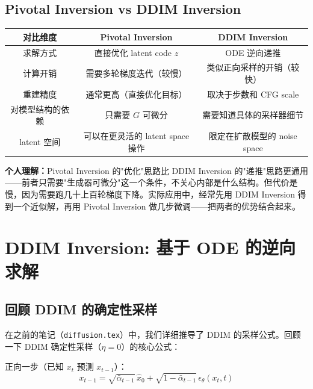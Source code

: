 \documentclass[11pt,a4paper]{article}
\theoremstyle{definition}
\begin{document}
\subsection{Pivotal Inversion vs DDIM Inversion}

\begin{center}
\begin{tabular}{c|c|c}
    \toprule
    \textbf{对比维度} & \textbf{Pivotal Inversion} & \textbf{DDIM Inversion} \\
    \midrule
    求解方式 & 直接优化 latent code $z$ & ODE 逆向递推 \\
    计算开销 & 需要多轮梯度迭代（较慢） & 类似正向采样的开销（较快） \\
    重建精度 & 通常更高（直接优化目标） & 取决于步数和 CFG scale \\
    对模型结构的依赖 & 只需要 $G$ 可微分 & 需要知道具体的采样器细节 \\
    latent 空间 & 可以在更灵活的 latent space 操作 & 限定在扩散模型的 noise space \\
    \bottomrule
\end{tabular}
\end{center}

\textbf{个人理解：}Pivotal Inversion 的"优化"思路比 DDIM Inversion 的"递推"思路更通用——前者只需要"生成器可微分"这一个条件，不关心内部是什么结构。但代价是慢，因为需要跑几十上百轮梯度下降。实际应用中，经常先用 DDIM Inversion 得到一个近似解，再用 Pivotal Inversion 做几步微调——把两者的优势结合起来。


\section{DDIM Inversion: 基于 ODE 的逆向求解}

\subsection{回顾 DDIM 的确定性采样}

在之前的笔记（\texttt{diffusion.tex}）中，我们详细推导了 DDIM 的采样公式。回顾一下 DDIM 确定性采样（$\eta=0$）的核心公式：

正向一步（已知 $x_t$ 预测 $x_{t-1}$）：
\begin{equation}\label{eq:ddim_forward_rev}
    x_{t-1} = \sqrt{\bar{\alpha}_{t-1}}\, \hat{x}_0 + \sqrt{1 - \bar{\alpha}_{t-1}}\, \epsilon_\theta(x_t, t)
\end{equation}
\end{document}

